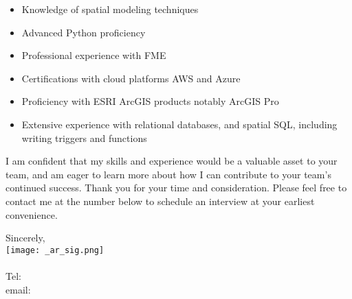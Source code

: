 \documentclass[letterpaper]{article}
\begin{document}
\vspace{-12pt}
\begin{itemize} \itemsep 0pt
\item Knowledge of spatial modeling techniques
\item Advanced Python proficiency
\item Professional experience with FME
\item Certifications with cloud platforms AWS and Azure
\item Proficiency with ESRI ArcGIS products notably ArcGIS Pro
\item Extensive experience with relational databases, and spatial SQL, including writing triggers and functions
\end{itemize}

I am confident that my skills and experience would be a valuable asset to your team, and
am eager to learn more about how I can contribute to your team's continued success.
Thank you for your time and consideration.
Please feel free to contact me at the number below to schedule an interview at your earliest convenience.

Sincerely,\\
    \hspace{1em}
    \texttt{[image: \_ar\_sig.png]} \\
    \CVsigname \\
    \small
    Tel: \CVphone \\
    email: \CVemail
\end{document}
